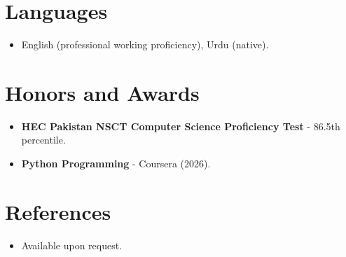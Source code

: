 \documentclass[11pt,a4paper,sans]{moderncv}
\begin{document}

\section{Languages}
\vspace{1pt}
\begin{itemize}
\item {English (professional working proficiency), Urdu (native).}
\end{itemize}


\section{Honors and Awards}
\vspace{1pt}
\begin{itemize}
\item{\textbf{HEC Pakistan NSCT Computer Science Proficiency Test} - 86.5th percentile.}
\item{\textbf{Python Programming} - Coursera (2026).}
\end{itemize}


\section{References}
\vspace{1pt}
\begin{itemize}
\item{Available upon request.}
\end{itemize}
\end{document}
